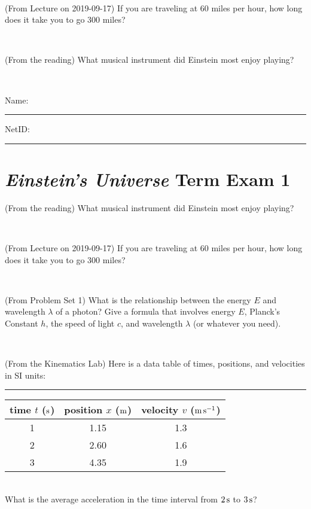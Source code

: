 \documentclass[12pt, letterpaper]{article}
\begin{document}
\vfill ~

\begin{problem} (From Lecture on 2019-09-17)
If you are traveling at 60 miles per hour, how long does
it take you to go 300 miles?
\end{problem}


\vfill ~

\begin{problem} (From the reading)
What musical instrument did Einstein most enjoy playing?
\end{problem}


\vfill ~


\cleardoublepage



\noindent
Name: \rule[-1ex]{0.60\textwidth}{0.1pt}
NetID: \rule[-1ex]{0.20\textwidth}{0.1pt}

\section*{\textsl{Einstein's Universe} Term Exam 1}
\setcounter{problem}{1}


\begin{problem} (From the reading)
What musical instrument did Einstein most enjoy playing?
\end{problem}


\vfill ~

\begin{problem} (From Lecture on 2019-09-17)
If you are traveling at 60 miles per hour, how long does
it take you to go 300 miles?
\end{problem}


\vfill ~

\begin{problem} (From Problem Set 1)
What is the relationship between the energy $E$ and wavelength
$\lambda$ of a photon? Give a formula that involves energy $E$,
Planck's Constant $h$, the speed of light $c$, and wavelength
$\lambda$ (or whatever you need).
\end{problem}

\vfill ~

\begin{problem} (From the Kinematics Lab)
Here is a data table of times, positions, and velocities in SI units:\\
\rule{1.0in}{0pt}\begin{tabular}{c|c|c}
time $t$ ($\mathrm{s}$) & position $x$ ($\mathrm{m}$) & velocity $v$ ($\mathrm{m}\,\mathrm{s}^{-1}$) \\
\hline
1 & 1.15 & 1.3 \\
2 & 2.60 & 1.6 \\
3 & 4.35 & 1.9 \\
\hline
\end{tabular}\\
What is the average acceleration in the time interval from $2\,\mathrm{s}$ to $3\,\mathrm{s}$?
\end{problem}
\end{document}
